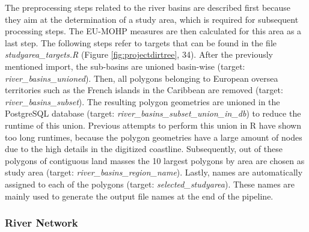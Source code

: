 \documentclass[fleqn,10pt]{wlscirep}
\begin{document}
The preprocessing steps related to the river basins are described first because they aim at the determination of a study area, which is required for subsequent processing steps. The EU-MOHP\cite{nolscher_eu-mohp_2021-1} measures are then calculated for this area as a last step. The following steps refer to targets that can be found in the file \emph{studyarea\_targets.R} (Figure \ref{fig:projectdirtree}, 34). After the previously mentioned import, the sub-basins are unioned basin-wise (target: \emph{river\_basins\_unioned}). Then, all polygons belonging to European oversea territories such as the French islands in the Caribbean are removed (target: \emph{river\_basins\_subset}). The resulting polygon geometries are unioned in the PostgreSQL database (target: \emph{river\_basins\_subset\_union\_in\_db}) to reduce the runtime of this union. Previous attempts to perform this union in R have shown too long runtimes, because the polygon geometries have a large amount of nodes due to the high details in the digitized coastline. Subsequently, out of these polygons of contiguous land masses the 10 largest polygons by area are chosen as study area (target: \emph{river\_basins\_region\_name}). Lastly, names are automatically assigned to each of the polygons (target: \emph{selected\_studyarea}). These names are mainly used to generate the output file names at the end of the pipeline.

\hypertarget{river-network}{%
\subsubsection*{River Network}\label{river-network}}
\end{document}
